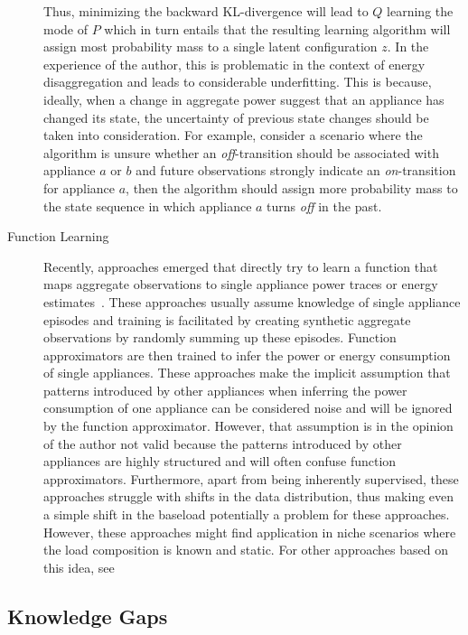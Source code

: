 \documentclass[11pt]{cmuthesis} %
\begin{document}
\begin{description}
Thus, minimizing the backward KL-divergence will lead to $Q$ learning the mode of $P$ which in turn entails that the resulting learning algorithm will assign most probability mass to a single latent configuration $z$. In the experience of the author, this is problematic in the context of energy disaggregation and leads to considerable underfitting. This is because, ideally, when a change in aggregate power suggest that an appliance has changed its state, the uncertainty of previous state changes should be taken into consideration. For example, consider a scenario where the algorithm is unsure whether an \emph{off}-transition should be associated with appliance $a$ or $b$ and future observations strongly indicate an \emph{on}-transition for appliance $a$, then the algorithm should assign more probability mass to the state sequence in which appliance $a$ turns \emph{off} in the past.
\fi
\item[Function Learning] Recently, approaches emerged that directly try to learn a function that maps aggregate observations to single appliance power traces or energy estimates~\cite{kelly2015neural}. These approaches usually assume knowledge of single appliance episodes and training is facilitated by creating synthetic aggregate observations by randomly summing up these episodes. Function approximators are then trained to infer the power or energy consumption of single appliances. These approaches make the implicit assumption that patterns introduced by other appliances when inferring the power consumption of one appliance can be considered noise and will be ignored by the function approximator. However, that assumption is in the opinion of the author not valid because the patterns introduced by other appliances are highly structured and will often confuse function approximators. Furthermore, apart from being inherently supervised, these approaches struggle with shifts in the data distribution, thus making even a simple shift in the baseload potentially a problem for these approaches. However, these approaches might find application in niche scenarios where the load composition is known and static. For other approaches based on this idea, see \cite{zhang2018sequence,barsim2018neural,salerno2018extreme,de2018appliance,roos1994using}
\end{description}

\subsection{Knowledge Gaps}
\end{document}
